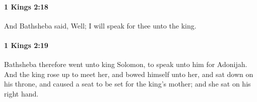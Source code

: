 		\paragraph{1 Kings 2:18} %
			\label{1KINGS-2-18}

			And Bathsheba said, Well; I will speak for thee unto the king.


		\paragraph{1 Kings 2:19} %
			\label{1KINGS-2-19}

			Bathsheba therefore went unto king Solomon, to speak unto him for Adonijah. And the king rose up to meet her, and bowed himself unto her, and sat down on his throne, and caused a seat to be set for the king’s mother; and she sat on his right hand.


